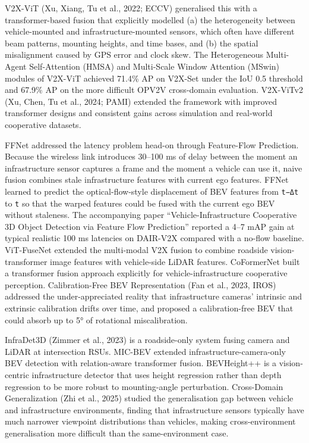 \documentclass{article}
\begin{document}
V2X-ViT (Xu, Xiang, Tu et al., 2022; ECCV) generalised this with a transformer-based fusion that explicitly modelled (a) the heterogeneity between vehicle-mounted and infrastructure-mounted sensors, which often have different beam patterns, mounting heights, and time bases, and (b) the spatial misalignment caused by GPS error and clock skew. The Heterogeneous Multi-Agent Self-Attention (HMSA) and Multi-Scale Window Attention (MSwin) modules of V2X-ViT achieved 71.4\% AP on V2X-Set under the IoU 0.5 threshold and 67.9\% AP on the more difficult OPV2V cross-domain evaluation. V2X-ViTv2 (Xu, Chen, Tu et al., 2024; PAMI) extended the framework with improved transformer designs and consistent gains across simulation and real-world cooperative datasets.

FFNet \citep{yu2023vehicleinfrastruct} addressed the latency problem head-on through Feature-Flow Prediction. Because the wireless link introduces 30--100 ms of delay between the moment an infrastructure sensor captures a frame and the moment a vehicle can use it, naive fusion combines stale infrastructure features with current ego features. FFNet learned to predict the optical-flow-style displacement of BEV features from \texttt{t−Δt} to \texttt{t} so that the warped features could be fused with the current ego BEV without staleness. The accompanying paper ``Vehicle-Infrastructure Cooperative 3D Object Detection via Feature Flow Prediction'' reported a 4--7 mAP gain at typical realistic 100 ms latencies on DAIR-V2X compared with a no-flow baseline. ViT-FuseNet \citep{zhou2023unidistillaunivers} extended the multi-modal V2X fusion to combine roadside vision-transformer image features with vehicle-side LiDAR features. CoFormerNet \citep{li2024bevformerlearningb} built a transformer fusion approach explicitly for vehicle-infrastructure cooperative perception. Calibration-Free BEV Representation (Fan et al., 2023, IROS) addressed the under-appreciated reality that infrastructure cameras' intrinsic and extrinsic calibration drifts over time, and proposed a calibration-free BEV that could absorb up to 5° of rotational miscalibration.

InfraDet3D (Zimmer et al., 2023) is a roadside-only system fusing camera and LiDAR at intersection RSUs. MIC-BEV \citep{zhang2025anewliteraturerevi} extended infrastructure-camera-only BEV detection with relation-aware transformer fusion. BEVHeight++ \citep{yang2023bevheighttowardrob} is a vision-centric infrastructure detector that uses height regression rather than depth regression to be more robust to mounting-angle perturbation. Cross-Domain Generalization (Zhi et al., 2025) studied the generalisation gap between vehicle and infrastructure environments, finding that infrastructure sensors typically have much narrower viewpoint distributions than vehicles, making cross-environment generalisation more difficult than the same-environment case.
\end{document}
